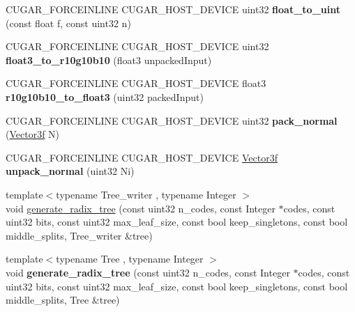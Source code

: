 \begin{DoxyCompactItemize}
C\+U\+G\+A\+R\+\_\+\+F\+O\+R\+C\+E\+I\+N\+L\+I\+NE C\+U\+G\+A\+R\+\_\+\+H\+O\+S\+T\+\_\+\+D\+E\+V\+I\+CE uint32 {\bfseries float\+\_\+to\+\_\+uint} (const float f, const uint32 n)
\item 
\mbox{\label{namespacecugar_a8c71bbd6ce1285357c90c2cf36d990e6}} 
C\+U\+G\+A\+R\+\_\+\+F\+O\+R\+C\+E\+I\+N\+L\+I\+NE C\+U\+G\+A\+R\+\_\+\+H\+O\+S\+T\+\_\+\+D\+E\+V\+I\+CE uint32 {\bfseries float3\+\_\+to\+\_\+r10g10b10} (float3 unpacked\+Input)
\item 
\mbox{\label{namespacecugar_a292b573424f5118c7f5e4f78ae7dc115}} 
C\+U\+G\+A\+R\+\_\+\+F\+O\+R\+C\+E\+I\+N\+L\+I\+NE C\+U\+G\+A\+R\+\_\+\+H\+O\+S\+T\+\_\+\+D\+E\+V\+I\+CE float3 {\bfseries r10g10b10\+\_\+to\+\_\+float3} (uint32 packed\+Input)
\item 
\mbox{\label{namespacecugar_a696007bb54c946f5eaaba5d7e3719c00}} 
C\+U\+G\+A\+R\+\_\+\+F\+O\+R\+C\+E\+I\+N\+L\+I\+NE C\+U\+G\+A\+R\+\_\+\+H\+O\+S\+T\+\_\+\+D\+E\+V\+I\+CE uint32 {\bfseries pack\+\_\+normal} (\hyperlink{structcugar_1_1_vector}{Vector3f} N)
\item 
\mbox{\label{namespacecugar_a373e3615546441dfae838aa0a9be365d}} 
C\+U\+G\+A\+R\+\_\+\+F\+O\+R\+C\+E\+I\+N\+L\+I\+NE C\+U\+G\+A\+R\+\_\+\+H\+O\+S\+T\+\_\+\+D\+E\+V\+I\+CE \hyperlink{structcugar_1_1_vector}{Vector3f} {\bfseries unpack\+\_\+normal} (uint32 Ni)
\item 
{\footnotesize template$<$typename Tree\+\_\+writer , typename Integer $>$ }\\void \hyperlink{group__radixtree_gafa925282e2b6e8bd87c1a00c1f1e6807}{generate\+\_\+radix\+\_\+tree} (const uint32 n\+\_\+codes, const Integer $\ast$codes, const uint32 bits, const uint32 max\+\_\+leaf\+\_\+size, const bool keep\+\_\+singletons, const bool middle\+\_\+splits, Tree\+\_\+writer \&tree)
\item 
\mbox{\label{namespacecugar_a1a90231339fadd45396afd3d8d7c344e}} 
{\footnotesize template$<$typename Tree , typename Integer $>$ }\\void {\bfseries generate\+\_\+radix\+\_\+tree} (const uint32 n\+\_\+codes, const Integer $\ast$codes, const uint32 bits, const uint32 max\+\_\+leaf\+\_\+size, const bool keep\+\_\+singletons, const bool middle\+\_\+splits, Tree \&tree)
\item 

\end{DoxyCompactItemize}
